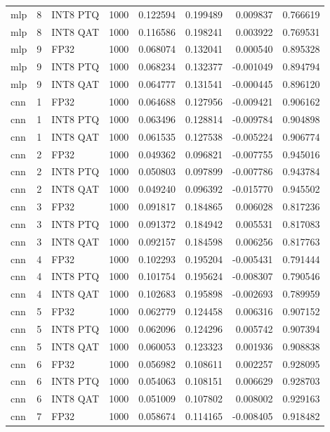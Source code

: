 \begin{tabular}{lrlrrrrr}
mlp & 8 & INT8 PTQ & 1000 & 0.122594 & 0.199489 & 0.009837 & 0.766619 \\
mlp & 8 & INT8 QAT & 1000 & 0.116586 & 0.198241 & 0.003922 & 0.769531 \\
mlp & 9 & FP32 & 1000 & 0.068074 & 0.132041 & 0.000540 & 0.895328 \\
mlp & 9 & INT8 PTQ & 1000 & 0.068234 & 0.132377 & -0.001049 & 0.894794 \\
mlp & 9 & INT8 QAT & 1000 & 0.064777 & 0.131541 & -0.000445 & 0.896120 \\
cnn & 1 & FP32 & 1000 & 0.064688 & 0.127956 & -0.009421 & 0.906162 \\
cnn & 1 & INT8 PTQ & 1000 & 0.063496 & 0.128814 & -0.009784 & 0.904898 \\
cnn & 1 & INT8 QAT & 1000 & 0.061535 & 0.127538 & -0.005224 & 0.906774 \\
cnn & 2 & FP32 & 1000 & 0.049362 & 0.096821 & -0.007755 & 0.945016 \\
cnn & 2 & INT8 PTQ & 1000 & 0.050803 & 0.097899 & -0.007786 & 0.943784 \\
cnn & 2 & INT8 QAT & 1000 & 0.049240 & 0.096392 & -0.015770 & 0.945502 \\
cnn & 3 & FP32 & 1000 & 0.091817 & 0.184865 & 0.006028 & 0.817236 \\
cnn & 3 & INT8 PTQ & 1000 & 0.091372 & 0.184942 & 0.005531 & 0.817083 \\
cnn & 3 & INT8 QAT & 1000 & 0.092157 & 0.184598 & 0.006256 & 0.817763 \\
cnn & 4 & FP32 & 1000 & 0.102293 & 0.195204 & -0.005431 & 0.791444 \\
cnn & 4 & INT8 PTQ & 1000 & 0.101754 & 0.195624 & -0.008307 & 0.790546 \\
cnn & 4 & INT8 QAT & 1000 & 0.102683 & 0.195898 & -0.002693 & 0.789959 \\
cnn & 5 & FP32 & 1000 & 0.062779 & 0.124458 & 0.006316 & 0.907152 \\
cnn & 5 & INT8 PTQ & 1000 & 0.062096 & 0.124296 & 0.005742 & 0.907394 \\
cnn & 5 & INT8 QAT & 1000 & 0.060053 & 0.123323 & 0.001936 & 0.908838 \\
cnn & 6 & FP32 & 1000 & 0.056982 & 0.108611 & 0.002257 & 0.928095 \\
cnn & 6 & INT8 PTQ & 1000 & 0.054063 & 0.108151 & 0.006629 & 0.928703 \\
cnn & 6 & INT8 QAT & 1000 & 0.051009 & 0.107802 & 0.008002 & 0.929163 \\
cnn & 7 & FP32 & 1000 & 0.058674 & 0.114165 & -0.008405 & 0.918482 \\

\end{tabular}
